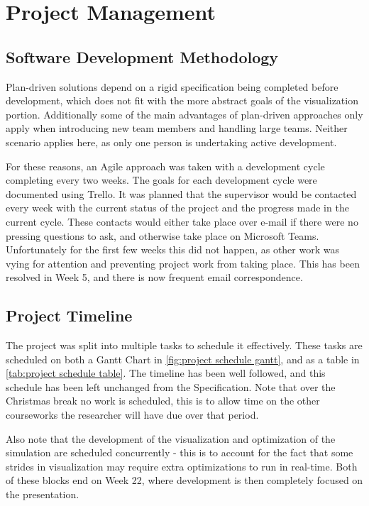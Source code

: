 
\chapter{Project Management}
\label{sec:ProjectManagement}

\section{Software Development Methodology}
Plan-driven solutions depend on a rigid specification being completed before development\cite{modules:CS261}, which does not fit with the more abstract goals of the visualization portion.
Additionally some of the main advantages of plan-driven approaches only apply when introducing new team members and handling large teams.
Neither scenario applies here, as only one person is undertaking active development.

For these reasons, an Agile approach was taken with a development cycle completing every two weeks.
The goals for each development cycle were documented using Trello\cite{tool:Trello}.
It was planned that the supervisor would be contacted every week with the current status of the project and the progress made in the current cycle.
These contacts would either take place over e-mail if there were no pressing questions to ask, and otherwise take place on Microsoft Teams\cite{tool:MicrosoftTeams}.
Unfortunately for the first few weeks this did not happen, as other work was vying for attention and preventing project work from taking place.
This has been resolved in Week 5, and there is now frequent email correspondence.

\section{Project Timeline}
The project was split into multiple tasks to schedule it effectively.
These tasks are scheduled on both a Gantt Chart in \cref{fig:project schedule gantt}, and as a table in \cref{tab:project schedule table}.
The timeline has been well followed, and this schedule has been left unchanged from the Specification. 
Note that over the Christmas break no work is scheduled, this is to allow time on the other courseworks the researcher will have due over that period.

Also note that the development of the visualization and optimization of the simulation are scheduled concurrently - this is to account for the fact that some strides in visualization may require extra optimizations to run in real-time.
Both of these blocks end on Week 22, where development is then completely focused on the presentation.

